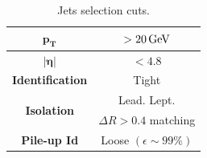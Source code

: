 \begin{minipage}{\linewidth}
\begin{minipage}{0.46\linewidth}
\begin{table}[H]
\begin{tabular}{c|c}
        $\mathbf{p_T}$& $>20 {\,\text{Ge\hspace{-.08em}V}}$\\
        \midrule
        $\bm{|\eta|}$& $<4.8$ \\
        \midrule
        \textbf{Identification} & Tight\\
        \midrule
        \multirow{2}{*}{\textbf{Isolation}} & Lead. Lept. \\
        &$\Delta R>0.4$ matching\\
        \midrule
        \textbf{Pile-up Id} & Loose  $(\epsilon\sim99\%)$ \\
        \bottomrule
    \end{tabular}
    \caption{Jets selection cuts.}
\end{table}
\end{minipage}   
\end{minipage}

